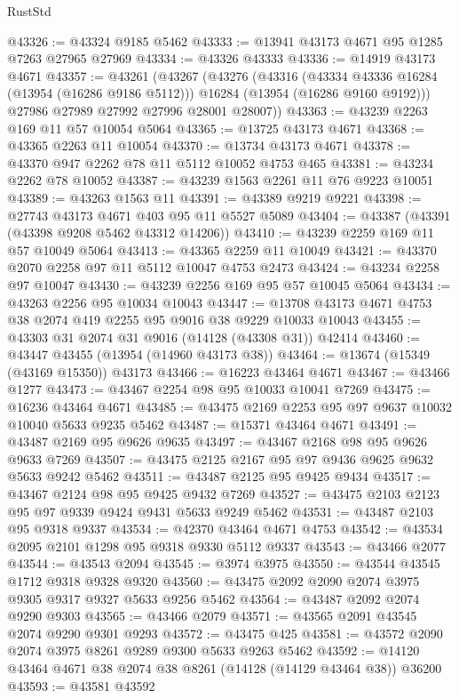 \begin{lexlean}{RustStd}
\begin{coremodule}
@43326 := @43324 @9185 @5462
@43333 := @13941 @43173 @4671 @95 @1285 @7263 @27965 @27969
@43334 := @43326 @43333
@43336 := @14919 @43173 @4671
@43357 := @43261
    (@43267
      (@43276
        (@43316
          (@43334 @43336 @16284 (@13954 (@16286 @9186 @5112)))
          @16284
          (@13954 (@16286 @9160 @9192)))
        @27986
        @27989
        @27992
        @27996
        @28001
        @28007))
@43363 := @43239 @2263 @169 @11 @57 @10054 @5064
@43365 := @13725 @43173 @4671
@43368 := @43365 @2263 @11 @10054
@43370 := @13734 @43173 @4671
@43378 := @43370 @947 @2262 @78 @11 @5112 @10052 @4753 @465
@43381 := @43234 @2262 @78 @10052
@43387 := @43239 @1563 @2261 @11 @76 @9223 @10051
@43389 := @43263 @1563 @11
@43391 := @43389 @9219 @9221
@43398 := @27743 @43173 @4671 @403 @95 @11 @5527 @5089
@43404 := @43387 (@43391 (@43398 @9208 @5462 @43312 @14206))
@43410 := @43239 @2259 @169 @11 @57 @10049 @5064
@43413 := @43365 @2259 @11 @10049
@43421 := @43370 @2070 @2258 @97 @11 @5112 @10047 @4753 @2473
@43424 := @43234 @2258 @97 @10047
@43430 := @43239 @2256 @169 @95 @57 @10045 @5064
@43434 := @43263 @2256 @95 @10034 @10043
@43447 := @13708 @43173 @4671 @4753 @38 @2074 @419 @2255 @95 @9016 @38 @9229 @10033 @10043
@43455 := @43303 @31 @2074 @31 @9016 (@14128 (@43308 @31)) @42414
@43460 := @43447 @43455 (@13954 (@14960 @43173 @38))
@43464 := @13674 (@15349 (@43169 @15350)) @43173
@43466 := @16223 @43464 @4671
@43467 := @43466 @1277
@43473 := @43467 @2254 @98 @95 @10033 @10041 @7269
@43475 := @16236 @43464 @4671
@43485 := @43475 @2169 @2253 @95 @97 @9637 @10032 @10040 @5633 @9235 @5462
@43487 := @15371 @43464 @4671
@43491 := @43487 @2169 @95 @9626 @9635
@43497 := @43467 @2168 @98 @95 @9626 @9633 @7269
@43507 := @43475 @2125 @2167 @95 @97 @9436 @9625 @9632 @5633 @9242 @5462
@43511 := @43487 @2125 @95 @9425 @9434
@43517 := @43467 @2124 @98 @95 @9425 @9432 @7269
@43527 := @43475 @2103 @2123 @95 @97 @9339 @9424 @9431 @5633 @9249 @5462
@43531 := @43487 @2103 @95 @9318 @9337
@43534 := @42370 @43464 @4671 @4753
@43542 := @43534 @2095 @2101 @1298 @95 @9318 @9330 @5112 @9337
@43543 := @43466 @2077
@43544 := @43543 @2094
@43545 := @3974 @3975
@43550 := @43544 @43545 @1712 @9318 @9328 @9320
@43560 := @43475 @2092 @2090 @2074 @3975 @9305 @9317 @9327 @5633 @9256 @5462
@43564 := @43487 @2092 @2074 @9290 @9303
@43565 := @43466 @2079
@43571 := @43565 @2091 @43545 @2074 @9290 @9301 @9293
@43572 := @43475 @425
@43581 := @43572 @2090 @2074 @3975 @8261 @9289 @9300 @5633 @9263 @5462
@43592 := @14120 @43464 @4671 @38 @2074 @38 @8261 (@14128 (@14129 @43464 @38)) @36200
@43593 := @43581 @43592

\end{coremodule}
\end{lexlean}
